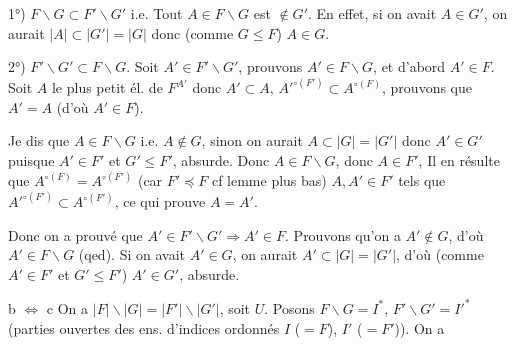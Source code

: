\documentclass[11pt,a4paper]{article}
\begin{document}
 1°) $F \smallsetminus G \subset F' \smallsetminus G'$ i.e. Tout $A \in F \smallsetminus G$ est $\notin G'$. En effet, si on avait $A \in G'$, on aurait $|A| \subset |G'| = |G|$ donc  (comme $G \leq F$) $A \in G$.

2°) $F' \smallsetminus G' \subset F \smallsetminus G$. Soit $A' \in F' \smallsetminus G'$, prouvons $A' \in F \smallsetminus G$, et d'abord $A' \in F$.  Soit $A$ le plus petit él. de $F^{A'}$ donc $A' \subset A$, $A'^{\circ(F')} \subset A^{\circ(F)}$, prouvons que $A' = A$ (d'où $A' \in F$). 

Je dis que $A \in F \smallsetminus G$ i.e. $A \notin G$, sinon on aurait $A \subset |G| = |G'|$ donc $A' \in G'$ puisque $A' \in F'$ et $G' \leq F'$, absurde.  Donc $A \in F \smallsetminus G$, donc $A \in F'$,  Il en résulte que $A^{\circ(F)} = A^{\circ(F')}$ (car $F' \preccurlyeq F$  cf lemme plus bas)  \struck{$\exists$} $A, A' \in F'$ tels que $A'^{\circ(F')} \subset A^{\circ(F')}$, ce qui prouve $A = A'$.

Donc on a prouvé que $A' \in F' \smallsetminus G' \Longrightarrow A' \in F$. Prouvons qu'on a $A' \notin G$, d'où $A' \in F \smallsetminus G$ (qed). Si on avait $A' \in G$, on aurait $A' \subset |G| = |G'|$, d'où (comme $A' \in F'$ et $G' \leq F'$) $A' \in G'$, absurde.


b $\Longleftrightarrow$ c  On a $|F| \smallsetminus |G| = |F'| \smallsetminus |G'|$, soit $U$. Posons $F \smallsetminus G = I^{*}$, $F' \smallsetminus G' = I'^{*}$ (parties ouvertes des ens. d'indices ordonnés $I$ ($= F$), $I'$ ($= F'$)). On a

\end{document}
